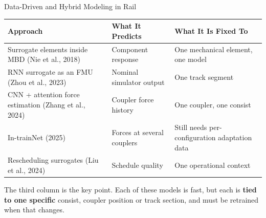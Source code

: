 \begin{frame}{Data-Driven and Hybrid Modeling in Rail}
  \vspace{0.4em}
  \centering
  {\footnotesize
  \begin{tabular}{@{}L{3.6cm}L{3.7cm}L{4.9cm}@{}}
    \toprule
    \textbf{Approach} & \textbf{What It Predicts} & \textbf{What It Is Fixed To} \\
    \midrule
    Surrogate elements inside MBD {\scriptsize (Nie et al., 2018)}
      & Component response
      & One mechanical element, one model \\[0.3em]
    RNN surrogate as an FMU {\scriptsize (Zhou et al., 2023)}
      & Nominal simulator output
      & One track segment \\[0.3em]
    CNN + attention force estimation {\scriptsize (Zhang et al., 2024)}
      & Coupler force history
      & \alert{One coupler, one consist} \\[0.3em]
    In-trainNet {\scriptsize (2025)}
      & Forces at several couplers
      & Still needs per-configuration adaptation data \\[0.3em]
    Rescheduling surrogates {\scriptsize (Liu et al., 2024)}
      & Schedule quality
      & One operational context \\
    \bottomrule
  \end{tabular}}

  \vspace{1.0em}
  \begin{minipage}{0.92\textwidth}\small
    The third column is the key point. Each of these models is fast, but each is
    \textbf{tied to one specific} consist, coupler position or track section, and
    must be retrained when that changes.
  \end{minipage}
\end{frame}

